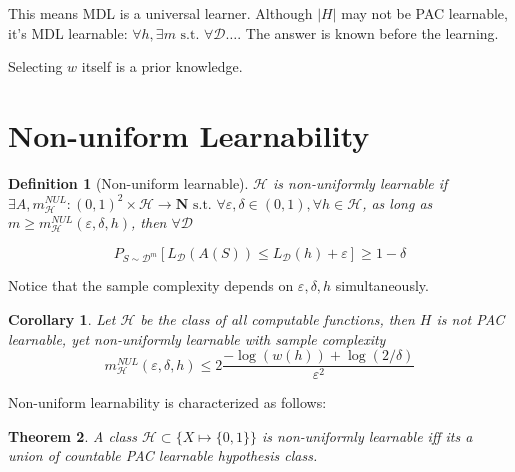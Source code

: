 \documentclass{book}
\newcommand{\st}{\text{ s.t. }}
\renewcommand{\H}{\mathcal{H}}
\newcommand{\D}{\mathcal{D}}
\newtheorem{Thm}{Theorem}[section]
\newtheorem{Cor}[Thm]{Corollary}
\newtheorem{Def}{Definition}[section]
\begin{document}
This means MDL is a universal learner. Although $|H|$ may not be PAC learnable, it's MDL learnable: $\forall h,\exists m\st \forall \D\dots$. The answer is known before the learning. 

Selecting $w$ itself is a prior knowledge.

\section{Non-uniform Learnability}
\begin{Def}[Non-uniform learnable]
  $\H$ is non-uniformly learnable if $\exists A, m_{\H}^{NUL}:(0,1)^{2}\times \H\to \mathbf{N}\st \forall \varepsilon,\delta\in (0,1), \forall h\in\H$, as long as $m\geq m_{\H}^{NUL}(\varepsilon,\delta,h)$, then $\forall \D$
  
\begin{equation}
P_{S\sim \D^m} \left[ L_{\D} \left( A \left( S \right) \right)\leq L_{\D}(h)+\varepsilon \right]\geq 1-\delta
\end{equation}
\end{Def}

Notice that the sample complexity depends on $\varepsilon,\delta,h$ simultaneously.

\begin{Cor}
  Let $\H$ be the class of all computable functions, then $H$ is not PAC learnable, yet non-uniformly learnable with sample complexity  
\begin{equation}
m_{\H}^{NUL} \left( \varepsilon,\delta,h \right)\leq 2 \frac{-\log(w(h))+\log(2/\delta)}{\varepsilon^2}
\end{equation}
\end{Cor}

Non-uniform learnability is characterized as follows:
\begin{Thm}
  A class $\H\subset \{X\mapsto \{0,1\}\}$ is non-uniformly learnable iff its a union of countable PAC learnable hypothesis class.
\end{Thm}
\end{document}
